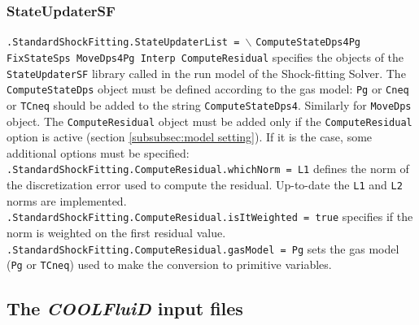 \documentclass[11pt,a4paper,oneside]{article}
\begin{document}
\subsubsection{StateUpdaterSF}
\label{subsubsec:state updater}

\hspace*{1cm} \texttt{.StandardShockFitting.StateUpdaterList = $\backslash$}
\newline
 \hspace*{1.3cm} \texttt{ComputeStateDps4Pg FixStateSps MoveDps4Pg Interp ComputeResidual}
\newline
\newline
specifies the objects of the \texttt{StateUpdaterSF} library called in the run model of the Shock-fitting Solver.
\newline
The \texttt{ComputeStateDps} object must be defined according to the gas model: \texttt{Pg} or \texttt{Cneq} or \texttt{TCneq} should be added to the string \texttt{ComputeStateDps4}. Similarly  for \texttt{MoveDps} object.
\newline
The \texttt{ComputeResidual} object must be added only if the \texttt{ComputeResidual} option is active (section \ref{subsubsec:model setting}). If it is the case, some additional options must be specified:
\newline
\newline
\hspace*{1cm} \texttt{.StandardShockFitting.ComputeResidual.whichNorm = L1}
\newline
\newline
defines the norm of the discretization error used to compute the residual. Up-to-date the \texttt{L1} and \texttt{L2} norms are implemented.
\newline
\newline
\hspace*{1cm} \texttt{.StandardShockFitting.ComputeResidual.isItWeighted = true}
\newline
\newline
specifies if the norm is weighted on the first residual value.
\newline
\newline
\hspace*{1cm} \texttt{.StandardShockFitting.ComputeResidual.gasModel = Pg}
\newline
\newline
sets the gas model (\texttt{Pg} or \texttt{TCneq}) used to make the conversion to primitive variables.


\subsection{The \textit{COOLFluiD} input files}
\label{subsec: cf input files}
\end{document}
